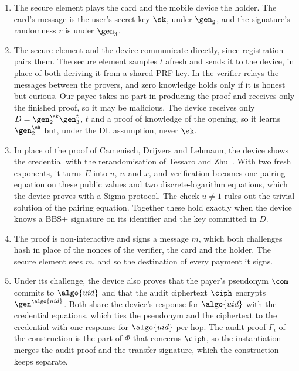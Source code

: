 \begin{enumerate}

  \item The secure element plays the card and the mobile device the holder. The
card's message is the user's secret key $\sk$, under $\gen_2$, and the
signature's randomness $r$ is under $\gen_3$.

  \item The secure element and the device communicate directly, since
registration pairs them. The secure element samples $t$ afresh and sends it to
the device, in place of both deriving it from a shared PRF key. In
 the verifier relays the messages between the
provers, and zero knowledge holds only if it is honest but curious. Our payee
takes no part in producing the proof and receives only the finished proof, so
it may be malicious. The device receives only $D = \gen_2^{\sk}\gen_3^{t}$, $t$
and a proof of knowledge of the opening, so it learns $\gen_2^{\sk}$ but, under
the DL assumption, never $\sk$.

  \item In place of the proof of Camenisch, Drijvers and Lehmann, the device
shows the credential with the rerandomisation of Tessaro and
Zhu~\cite{EC:TesZhu23b}. With two fresh exponents, it turns $E$ into $u$,
$w$ and $x$, and verification becomes one pairing equation on these public
values and two discrete-logarithm equations, which the device proves with a
Sigma protocol. The check $u \neq 1$ rules out the trivial solution of the
pairing equation. Together these hold exactly when the device knows a BBS+
signature on its identifier and the key committed in $D$.

  \item The proof is non-interactive and signs a message $m$, which both
challenges hash in place of the nonces of the verifier, the card and the holder.
The secure element sees $m$, and so the destination of every payment it signs.

  \item Under its challenge, the device also proves that the payer's pseudonym
$\com$ commits to $\algo{uid}$ and that the audit ciphertext $\ciph$ encrypts
$\gen^{\algo{uid}}$. Both share the device's response for $\algo{uid}$ with the
credential equations, which ties the pseudonym and the ciphertext to the
credential with one response for $\algo{uid}$ per hop. The audit proof
$\Gamma_i$ of the construction is the part of $\Phi$ that concerns $\ciph$, so the
instantiation merges the audit proof and the transfer signature, which the
construction keeps separate.

\end{enumerate}

